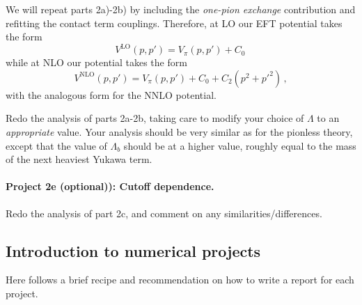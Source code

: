 \documentclass[%
oneside,                 %
final,                   %
10pt]{article}
\begin{document}
We will repeat parts 2a)-2b) by including the \emph{one-pion exchange}
contribution and refitting the contact term couplings. Therefore, at
LO our EFT potential takes the form
\[
V^\mathrm{LO}(p,p')= V_{\pi}(p,p') + C_0\,
\]
while at NLO our potential takes the form
\[
V^\mathrm{NLO}(p,p')= V_{\pi}(p,p') + C_0 + C_2(p^2+p'^2)\,,
\]
with the analogous form for the NNLO potential. 

Redo the analysis of parts 2a-2b, taking care to modify your choice of
$\Lambda$ to an \emph{appropriate} value.  Your analysis should be very
similar as for the pionless theory, except that the value of
$\Lambda_b$ should be at a higher value, roughly equal to the mass of
the next heaviest Yukawa term.

\paragraph{Project 2e (optional)): Cutoff dependence.}
Redo the analysis of part 2c, and comment on any similarities/differences. 


\subsection{Introduction to numerical projects}

Here follows a brief recipe and recommendation on how to write a report for each
project.
\end{document}
